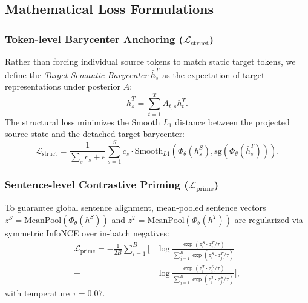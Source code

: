 \documentclass[11pt]{article}
\begin{document}
\subsection{Mathematical Loss Formulations}

\subsubsection{Token-level Barycenter Anchoring ($\mathcal{L}_{\text{struct}}$)}
Rather than forcing individual source tokens to match static target tokens, we define the \textit{Target Semantic Barycenter} $\bar{h}_s^T$ as the expectation of target representations under posterior $A$:
\begin{equation}
    \bar{h}_s^T = \sum_{t=1}^T A_{t, s} h_t^T.
    \label{eq:barycenter}
\end{equation}
The structural loss minimizes the Smooth $L_1$ distance between the projected source state and the detached target barycenter:
\begin{equation}
    \mathcal{L}_{\text{struct}} = \frac{1}{\sum_s c_s + \epsilon} \sum_{s=1}^S c_s \cdot \text{Smooth}_{L1}\left(\Phi_\theta(h_s^S), \text{sg}(\Phi_\theta(\bar{h}_s^T))\right).
    \label{eq:loss_struct}
\end{equation}

\subsubsection{Sentence-level Contrastive Priming ($\mathcal{L}_{\text{prime}}$)}
To guarantee global sentence alignment, mean-pooled sentence vectors $z^S = \text{MeanPool}(\Phi_\theta(h^S))$ and $z^T = \text{MeanPool}(\Phi_\theta(h^T))$ are regularized via symmetric InfoNCE over in-batch negatives:
\begin{align}
    \mathcal{L}_{\text{prime}} = -\frac{1}{2B} \sum_{i=1}^B \Bigg[ &\log \frac{\exp(z_i^S \cdot z_i^T / \tau)}{\sum_{j=1}^B \exp(z_i^S \cdot z_j^T / \tau)} \nonumber \\
    + &\log \frac{\exp(z_i^T \cdot z_i^S / \tau)}{\sum_{j=1}^B \exp(z_i^T \cdot z_j^S / \tau)} \Bigg],
\end{align}
with temperature $\tau = 0.07$.
\end{document}
